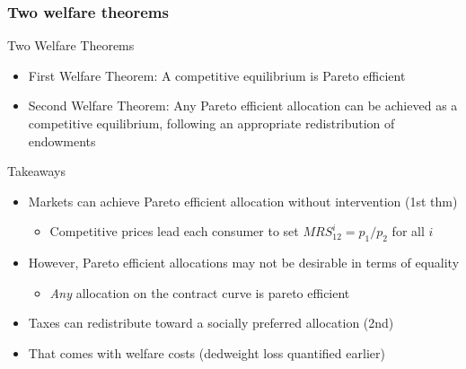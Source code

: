 \documentclass[aspectratio=169]{beamer}
\begin{document}
\begin{frame}
\frametitle{Two welfare theorems}
\begin{block}{Two Welfare Theorems}
\begin{itemize}\setlength\itemsep{3pt}
\item First Welfare Theorem: A competitive equilibrium is Pareto efficient
\item Second Welfare Theorem: Any Pareto efficient allocation can be achieved as a competitive equilibrium, following an appropriate redistribution of endowments\\
\end{itemize}
\end{block} \medskip
Takeaways
\begin{itemize}\setlength\itemsep{3pt}
  \item Markets can achieve Pareto efficient allocation without intervention (1st thm)
  \begin{itemize}\setlength\itemsep{3pt}
  \item Competitive prices lead each consumer to set 
  $MRS^i_{12} = p_1/p_2$ for all $i$
  \end{itemize}
  \item However, Pareto efficient allocations may not be desirable in terms of equality
   \begin{itemize}
  \item \textit{Any} allocation on the contract curve is pareto efficient
  \end{itemize}

  \item Taxes can redistribute toward a socially preferred allocation (2nd)
  \item That comes with welfare costs (dedweight loss quantified earlier)
\end{itemize}
\end{frame}
\end{document}
